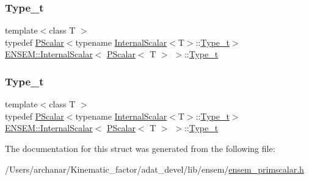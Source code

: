 \subsubsection{\texorpdfstring{Type\_t}{Type\_t}\hspace{0.1cm}{\footnotesize\ttfamily [1/2]}}
{\footnotesize\ttfamily template$<$class T $>$ \\
typedef \mbox{\hyperlink{classENSEM_1_1PScalar}{P\+Scalar}}$<$typename \mbox{\hyperlink{structENSEM_1_1InternalScalar}{Internal\+Scalar}}$<$T$>$\+::\mbox{\hyperlink{structENSEM_1_1InternalScalar_3_01PScalar_3_01T_01_4_01_4_a897c699063633ac7fc5b18fee8981b82}{Type\+\_\+t}}$>$ \mbox{\hyperlink{structENSEM_1_1InternalScalar}{E\+N\+S\+E\+M\+::\+Internal\+Scalar}}$<$ \mbox{\hyperlink{classENSEM_1_1PScalar}{P\+Scalar}}$<$ T $>$ $>$\+::\mbox{\hyperlink{structENSEM_1_1InternalScalar_3_01PScalar_3_01T_01_4_01_4_a897c699063633ac7fc5b18fee8981b82}{Type\+\_\+t}}}

\mbox{\label{structENSEM_1_1InternalScalar_3_01PScalar_3_01T_01_4_01_4_a897c699063633ac7fc5b18fee8981b82}} 
\subsubsection{\texorpdfstring{Type\_t}{Type\_t}\hspace{0.1cm}{\footnotesize\ttfamily [2/2]}}
{\footnotesize\ttfamily template$<$class T $>$ \\
typedef \mbox{\hyperlink{classENSEM_1_1PScalar}{P\+Scalar}}$<$typename \mbox{\hyperlink{structENSEM_1_1InternalScalar}{Internal\+Scalar}}$<$T$>$\+::\mbox{\hyperlink{structENSEM_1_1InternalScalar_3_01PScalar_3_01T_01_4_01_4_a897c699063633ac7fc5b18fee8981b82}{Type\+\_\+t}}$>$ \mbox{\hyperlink{structENSEM_1_1InternalScalar}{E\+N\+S\+E\+M\+::\+Internal\+Scalar}}$<$ \mbox{\hyperlink{classENSEM_1_1PScalar}{P\+Scalar}}$<$ T $>$ $>$\+::\mbox{\hyperlink{structENSEM_1_1InternalScalar_3_01PScalar_3_01T_01_4_01_4_a897c699063633ac7fc5b18fee8981b82}{Type\+\_\+t}}}



The documentation for this struct was generated from the following file\+:\begin{DoxyCompactItemize}
\item 
/\+Users/archanar/\+Kinematic\+\_\+factor/adat\+\_\+devel/lib/ensem/\mbox{\hyperlink{lib_2ensem_2ensem__primscalar_8h}{ensem\+\_\+primscalar.\+h}}\end{DoxyCompactItemize}
